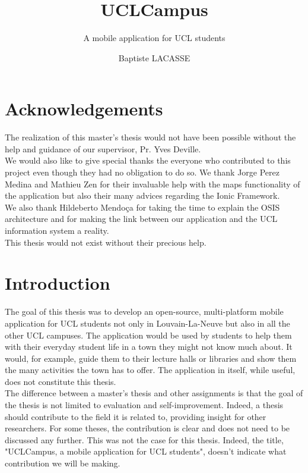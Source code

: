 \documentclass{eplmastersthesis}
\title{UCLCampus}	%
\subtitle{A mobile application for UCL students}			%
\author{Baptiste \textsc{LACASSE}}	%
\begin{document}
\maketitle					%
\thispagestyle{empty}		%
\chapter*{Acknowledgements}
The realization of this master's thesis would not have been possible without the help and guidance of our supervisor, Pr. Yves Deville.\\

We would also like to give special thanks the everyone who contributed to this project even though they had no obligation to do so. We thank Jorge Perez Medina and Mathieu Zen for their invaluable help with the maps functionality of the application but also their many advices regarding the Ionic Framework.\\

 We also thank Hildeberto Mendoça for taking the time to explain the OSIS architecture and for making the link between our application and the UCL information system a reality.\\

This thesis would not exist without their precious help.
\tableofcontents %
\newpage %
\linespread{1.2} %

\chapter{Introduction} %

The goal of this thesis was to develop an open-source, multi-platform mobile application for UCL students not only in Louvain-La-Neuve but also in all the  other UCL campuses. The application would be used by students to help them with their everyday student life in a town they might not know much about. It would, for example, guide them to their lecture halls or libraries and show them the many activities the town has to offer. The application in itself, while useful, does not constitute this thesis.\\

The difference between a master's thesis and other assignments is that the goal of the thesis is not limited to evaluation and self-improvement. Indeed, a thesis should contribute to the field it is related to, providing insight for other researchers. For some theses, the contribution is clear and does not need to be discussed any further. This was not the case for this thesis. Indeed, the title, "UCLCampus, a mobile application for UCL students", doesn't indicate what contribution we will be making.\\
\end{document}
